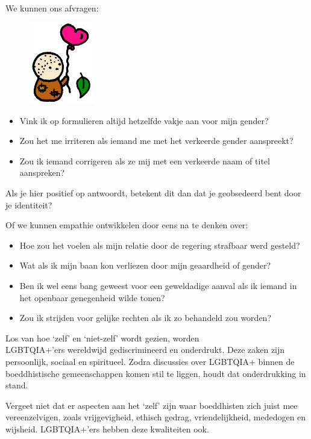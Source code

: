 \documentclass[12pt,openany]{book}
\begin{document}
We kunnen ons afvragen:
\begin{figure}
    \centering
    \includegraphics[width=0.25\textwidth]{33c.png}
\end{figure}
\begin{itemize}
\setlength\itemsep{-0.3em}
\item Vink ik op formulieren altijd hetzelfde vakje aan voor mijn gender?
\item Zou het me irriteren als iemand me met het verkeerde gender aanspreekt?
\item Zou ik iemand corrigeren als ze mij met een verkeerde naam of titel aanspreken?
\end{itemize}

Als je hier positief op antwoordt, betekent dit dan dat je geobsedeerd bent door je identiteit?

Of we kunnen empathie ontwikkelen door eens na te denken over:

\begin{itemize}
\setlength\itemsep{-0.3em}
\item Hoe zou het voelen als mijn relatie door de regering strafbaar werd gesteld?
\item Wat als ik mijn baan kon verliezen door mijn geaardheid of gender?
\item Ben ik wel eens bang geweest voor een geweldadige aanval als ik iemand in het openbaar genegenheid wilde tonen?
\item Zou ik strijden voor gelijke rechten als ik zo behandeld zou worden?
\end{itemize}

Los van hoe `zelf' en `niet-zelf' wordt gezien, worden \\ \noindent \mbox{LGBTQIA+'ers} wereldwijd gediscrimineerd en onderdrukt. Deze zaken zijn persoonlijk, sociaal en spiritueel. Zodra discussies over LGBTQIA+ binnen de boeddhistische gemeenschappen komen stil te liggen, houdt dat onderdrukking in stand.

Vergeet niet dat er aspecten aan het `zelf' zijn waar boeddhisten zich juist mee vereenzelvigen, zoals vrijgevigheid, ethisch gedrag, vriendelijkheid, mededogen en wijsheid. LGBTQIA+'ers hebben deze kwaliteiten ook.
\end{document}
